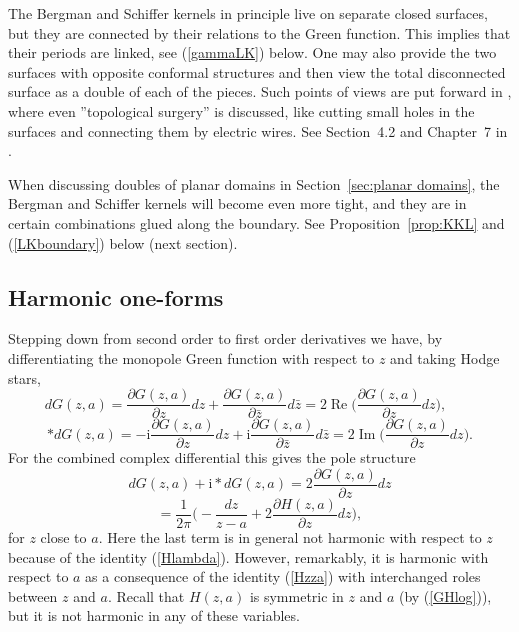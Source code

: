 \documentclass[reqno,12pt]{article}
\theoremstyle{plain}
\theoremstyle{definition}
\numberwithin{equation}{section}
\numberwithin{figure}{section}
\DeclareMathOperator{\re}{Re}
\DeclareMathOperator{\im}{Im}
\def\I{\mathrm{i}}
\begin{document}
The Bergman and Schiffer kernels in principle live on separate closed surfaces, but they are connected by their 
relations to the Green function. This implies that their periods are linked, see (\ref{gammaLK}) below. 
One may also provide the two surfaces with opposite conformal structures and then view the total disconnected surface as
a double of each of the pieces. Such points of views are put forward in \cite{Schiffer-Spencer-1954}, where even ''topological surgery''
is discussed, like cutting small holes in the surfaces and connecting them by electric wires. See Section~4.2 and Chapter~7 
in \cite{Schiffer-Spencer-1954}.

When discussing doubles of planar domains in Section~\ref{sec:planar domains}, the Bergman and Schiffer kernels will become 
even more tight, and they are in certain combinations  glued along the boundary. 
See Proposition~\ref{prop:KKL} and (\ref{LKboundary}) below (next section).


\subsection{Harmonic one-forms}\label{sec:harmonic forms}

Stepping down from second order to first order derivatives we have, by
differentiating the monopole Green function with respect to $z$ and taking Hodge stars, 
$$
dG(z,a)=\frac{\partial G(z,a)}{\partial z}dz+\frac{\partial G(z,a)}{\partial \bar{z}}d\bar{z}=2\re \big(\frac{\partial G(z,a)}{\partial z}dz\big),\qquad 
$$
\begin{equation}\label{stardG0}
*dG(z,a)=-\I\frac{\partial G(z,a)}{\partial z}dz+\I\frac{\partial G(z,a)}{\partial \bar{z}}d\bar{z}=2\im \big(\frac{\partial G(z,a)}{\partial z}dz\big).
\end{equation}
For the combined complex differential this gives the pole structure
$$
dG(z,a)+\I *dG(z,a) =2\frac{\partial G(z,a)}{\partial z}dz
$$
\begin{equation}\label{dGistardG}
=\frac{1}{2\pi}\Big(-\frac{dz}{z-a}+2\frac{\partial H(z,a)}{\partial z}dz\Big),
\end{equation}
for $z$ close to $a$. 
Here the last term is in general not harmonic with respect to $z$ because of the identity (\ref{Hlambda}).
However, remarkably, it is harmonic with respect to $a$ as a consequence of the identity (\ref{Hzza}) with 
interchanged roles between $z$ and $a$. Recall that $H(z,a)$ is symmetric in $z$ and $a$ (by (\ref{GHlog})),
but it is not harmonic in any of these variables. 
\end{document}
